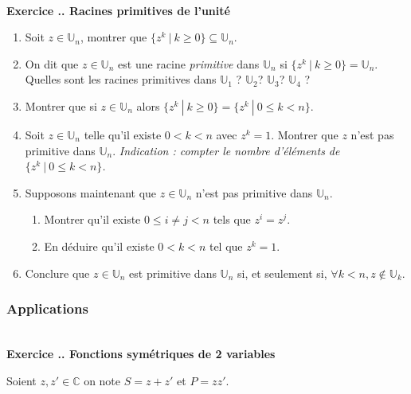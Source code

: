 \documentclass{article}
\newcommand{\mb}[1]{\mathbb{#1}}
\newcounter{exo}
\newcommand{\exercice}[1][\null]{\textbf{\\ Exercice \thesection.\theexo. #1} \addtocounter{exo}{1}}
\begin{document}
\exercice[Racines primitives de l'unité]

\begin{enumerate}

\item Soit $z \in \mb{U}_n$, montrer que $\{z^k~|~k \ge 0\} \subseteq \mb{U}_n$.

\item On dit que $z \in \mb{U}_n$ est une racine \emph{primitive} dans $\mb{U}
_n$ si  $\{z^k~|~k \ge 0\} = \mb{U}_n$. Quelles sont les racines primitives dans  $\mb{U}_1$ ? $\mb{U}_2$? $\mb{U}_3$? $\mb{U}_4$ ?

\item Montrer que si $z \in \mb{U}_n$ alors $\{z^k~|~k \ge 0\} = \{z^k~|~0 \le k < n\}$.

\item  Soit $z \in \mb{U}_n$ telle qu'il existe $ 0 < k < n$ avec $z^k = 1$. Montrer que $z$ n'est pas primitive dans $\mb{U}_n$.
\emph{Indication : compter le nombre d'éléments de $\{z^k~|~0 \le k < n\}$.}

\item Supposons maintenant que $z \in \mb{U}_n$ n'est pas primitive dans $\mb{U}_n$.  \begin{enumerate} 

\item Montrer qu'il existe $0 \le i\neq j < n$ tels que $z^i = z^j$.
\item En déduire qu'il existe $0 < k < n$ tel que $z^k = 1$.

\end{enumerate}

\item Conclure que $z \in \mb{U}_n$ est primitive dans $\mb{U}_n$ si, et seulement si, $\forall k < n, z \not \in \mb{U}_k$.

\end{enumerate}











\subsubsection{Applications}

\exercice[Fonctions symétriques de 2 variables]

Soient $z, z' \in \mb{C}$ on note $S = z + z'$ et $P = z z'$.
\end{document}
